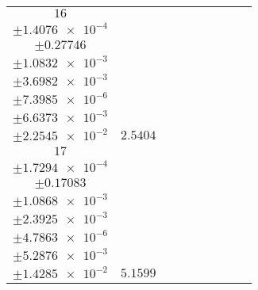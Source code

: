 \documentclass[8pt]{article}
\begin{document}
\begin{longtable}[l]{c c c c c c c c c}
$\num{16}$ & \begin{tabular}[c]{@{}c@{}}$\num{2.9749e-2}$ \\ $\pm\num{1.4076e-4}$\end{tabular} & \begin{tabular}[c]{@{}c@{}}$\num{-0.58787}$ \\ $\pm\num{0.27746}$\end{tabular} & \begin{tabular}[c]{@{}c@{}}$\num{2.5916}$ \\ $\pm\num{1.0832e-3}$\end{tabular} & \begin{tabular}[c]{@{}c@{}}$\num{1.612e+3}$ \\ $\pm\num{3.6982e-3}$\end{tabular} & \begin{tabular}[c]{@{}c@{}}$\num{3.2249}$ \\ $\pm\num{7.3985e-6}$\end{tabular} & \begin{tabular}[c]{@{}c@{}}$\num{1.1602}$ \\ $\pm\num{6.6373e-3}$\end{tabular} & \begin{tabular}[c]{@{}c@{}}$\num{4.1454}$ \\ $\pm\num{2.2545e-2}$\end{tabular} & $\num{2.5404}$\\
$\num{17}$ & \begin{tabular}[c]{@{}c@{}}$\num{6.6248e-2}$ \\ $\pm\num{1.7294e-4}$\end{tabular} & \begin{tabular}[c]{@{}c@{}}$\num{0.46099}$ \\ $\pm\num{0.17083}$\end{tabular} & \begin{tabular}[c]{@{}c@{}}$\num{6.9518}$ \\ $\pm\num{1.0868e-3}$\end{tabular} & \begin{tabular}[c]{@{}c@{}}$\num{1.6163e+3}$ \\ $\pm\num{2.3925e-3}$\end{tabular} & \begin{tabular}[c]{@{}c@{}}$\num{3.2335}$ \\ $\pm\num{4.7863e-6}$\end{tabular} & \begin{tabular}[c]{@{}c@{}}$\num{1.8249}$ \\ $\pm\num{5.2876e-3}$\end{tabular} & \begin{tabular}[c]{@{}c@{}}$\num{4.5367}$ \\ $\pm\num{1.4285e-2}$\end{tabular} & $\num{5.1599}$\\

\end{longtable}
\end{document}
